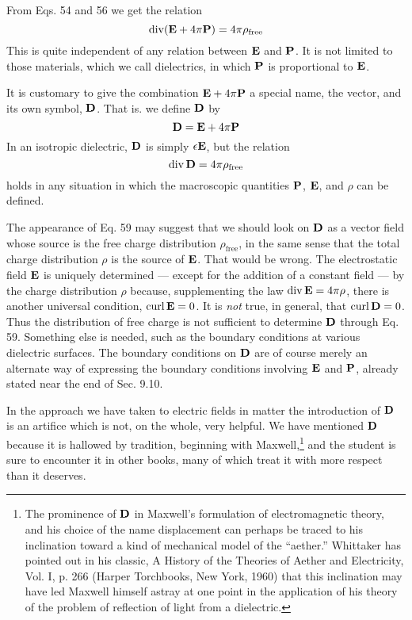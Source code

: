 From Eqs. 54 and 56 we get the relation
\begin{equation}
  \operatorname{div}(\mathbf{E}+4\pi\mathbf{P}) = 4\pi\rho_\text{free}
\end{equation}
This is quite independent of any relation between $\mathbf{E}$ and $\mathbf{P}$. It is not
limited to those materials, which we call dielectrics, in which $\mathbf{P}$ is
proportional to $\mathbf{E}$.

It is customary to give the combination $\mathbf{E}+4\pi\mathbf{P}$ a special name,
the  vector, and its own symbol, $\mathbf{D}$. That is. we
define $\mathbf{D}$ by
\begin{equation}
  \mathbf{D} = \mathbf{E}+4\pi\mathbf{P}
\end{equation}
In an isotropic dielectric, $\mathbf{D}$ is simply $\epsilon\mathbf{E}$, but the relation
\begin{equation}
  \operatorname{div}\mathbf{D} = 4\pi\rho_\text{free}
\end{equation}
holds in any situation in which the macroscopic quantities $\mathbf{P}$, $\mathbf{E}$, and
$\rho$ can be defined.

The appearance of Eq. 59 may suggest that we should look on $\mathbf{D}$
as a vector field whose source is the free charge distribution $\rho_\text{free}$, in
the same sense that the total charge distribution $\rho$ is the source of $\mathbf{E}$.
That would be wrong. The electrostatic field $\mathbf{E}$ is uniquely determined
--- except for the addition of a constant field --- by the charge
distribution $\rho$ because, supplementing the law $\operatorname{div}\mathbf{E}=4\pi\rho$, there
is another universal condition, $\operatorname{curl}\mathbf{E} = 0$. It is \emph{not} true, in general,
that $\operatorname{curl}\mathbf{D} = 0$. Thus the distribution of free charge is not sufficient
to determine $\mathbf{D}$ through Eq. 59. Something else is needed, such as
the boundary conditions at various dielectric surfaces. The boundary
conditions on $\mathbf{D}$ are of course merely an alternate way of expressing
the boundary conditions involving $\mathbf{E}$ and $\mathbf{P}$, already stated near
the end of Sec. 9.10.

In the approach we have taken to electric fields in matter the introduction
of $\mathbf{D}$ is an artifice which is not, on the whole, very helpful.
We have mentioned $\mathbf{D}$ because it is hallowed by tradition, beginning
with Maxwell,\footnote{The prominence of $\mathbf{D}$
in Maxwell's formulation of electromagnetic theory, and his
choice of the name displacement can perhaps be traced to his inclination toward a
kind of mechanical model of the ``aether.'' Whittaker has pointed out in his classic,
A History of the Theories of Aether and Electricity, Vol. I, p. 266 (Harper Torchbooks,
New York, 1960) that this inclination may have led Maxwell himself astray at one
point in the application of his theory of the problem of reflection of light 
from a dielectric.} and the student is sure to encounter it in other books,
many of which treat it with more respect than it deserves.

